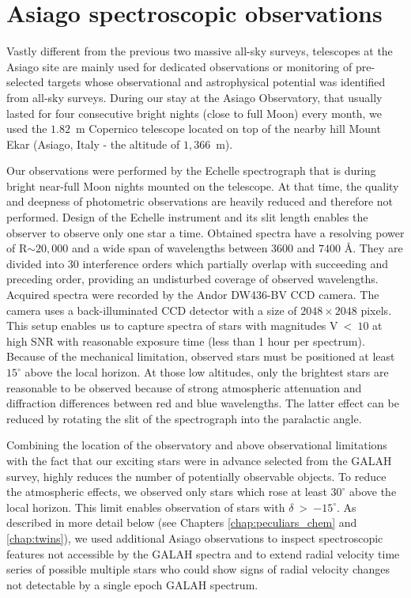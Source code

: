 \section{Asiago spectroscopic observations}
\label{sec:asiago_data}
Vastly different from the previous two massive all-sky surveys, telescopes at the Asiago site are mainly used for dedicated observations or monitoring of pre-selected targets whose observational and astrophysical potential was identified from all-sky surveys. During our stay at the Asiago Observatory, that usually lasted for four consecutive bright nights (close to full Moon) every month, we used the $1.82$~m Copernico telescope located on top of the nearby hill Mount Ekar (Asiago, Italy - the altitude of $1,366$~m).

Our observations were performed by the Echelle spectrograph that is during bright near-full Moon nights mounted on the telescope. At that time, the quality and deepness of photometric observations are heavily reduced and therefore not performed. Design of the Echelle instrument and its slit length enables the observer to observe only one star a time. Obtained spectra have a resolving power of R$\sim20,000$ and a wide span of wavelengths between $3600$ and $7400$ \AA. They are divided into 30 interference orders which partially overlap with succeeding and preceding order, providing an undisturbed coverage of observed wavelengths. Acquired spectra were recorded by the Andor DW436-BV CCD camera. The camera uses a back-illuminated CCD detector with a size of $2048 \times 2048$ pixels. This setup enables us to capture spectra of stars with magnitudes V~<~$10$ at high SNR with reasonable exposure time (less than 1 hour per spectrum). Because of the mechanical limitation, observed stars must be positioned at least $15^\circ$ above the local horizon. At those low altitudes, only the brightest stars are reasonable to be observed because of strong atmospheric attenuation and diffraction differences between red and blue wavelengths. The latter effect can be reduced by rotating the slit of the spectrograph into the paralactic angle.

Combining the location of the observatory and above observational limitations with the fact that our exciting stars were in advance selected from the GALAH survey, highly reduces the number of potentially observable objects. To reduce the atmospheric effects, we observed only stars which rose at least $30^\circ$ above the local horizon. This limit enables observation of stars with $\delta$~>~$-15^\circ$. As described in more detail below (see Chapters \ref{chap:peculiars_chem} and \ref{chap:twins}), we used additional Asiago observations to inspect spectroscopic features not accessible by the GALAH spectra and to extend radial velocity time series of possible multiple stars who could show signs of radial velocity changes not detectable by a single epoch GALAH spectrum.

